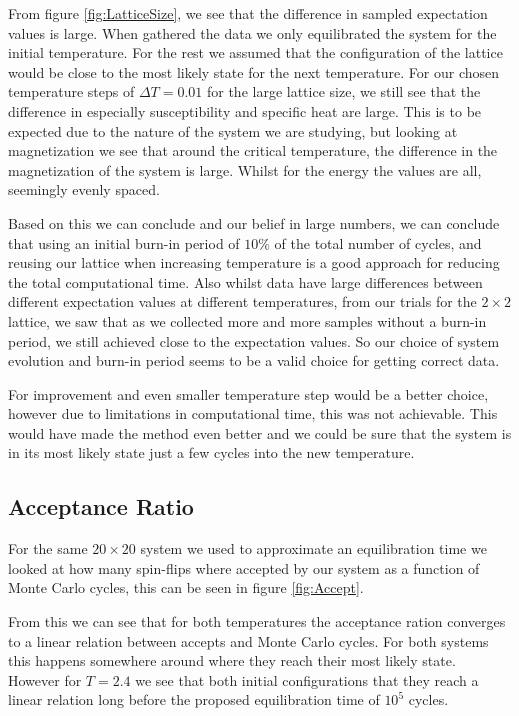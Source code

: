 \documentclass[%
reprint,
nofootinbib,
amsmath,amssymb,
aps,
]{revtex4-1}
\begin{document}
From figure \ref{fig:LatticeSize}, we see that the difference in sampled expectation values is large. When gathered the data we only equilibrated the system for the initial temperature. For the rest we assumed that the configuration of the lattice would be close to the most likely state for the next temperature. For our chosen temperature steps of $\Delta T = 0.01$ for the large lattice size, we still see that the difference in especially susceptibility and specific heat are large. This is to be expected due to the nature of the system we are studying, but looking at magnetization we see that around the critical temperature, the difference in the magnetization of the system is large. Whilst for the energy the values are all, seemingly evenly spaced. 

Based on this we can conclude and our belief in large numbers, we can conclude that using an initial burn-in period of $10\%$ of the total number of cycles, and reusing our lattice when increasing temperature is a good approach for reducing the total computational time. Also whilst data have large differences between different expectation values at different temperatures, from our trials for the $2\times 2$ lattice, we saw that as we collected more and more samples without a burn-in period, we still achieved close to the expectation values. So our choice of system evolution and burn-in period seems to be a valid choice for getting correct data.

For improvement and even smaller temperature step would be a better choice, however due to limitations in computational time, this was not achievable. This would have made the method even better and we could be sure that the system is in its most likely state just a few cycles into the new temperature. 

\subsection{Acceptance Ratio} %
For the same $20\times 20$ system we used to approximate an equilibration time we looked at how many spin-flips where accepted by our system as a function of Monte Carlo cycles, this can be seen in figure \ref{fig:Accept}. 

From this we can see that for both temperatures the acceptance ration converges to a linear relation between accepts and Monte Carlo cycles. For both systems this happens somewhere around where they reach their most likely state. However for $T=2.4$ we see that both initial configurations that they reach a linear relation long before the proposed equilibration time of $10^5$ cycles.
\end{document}
